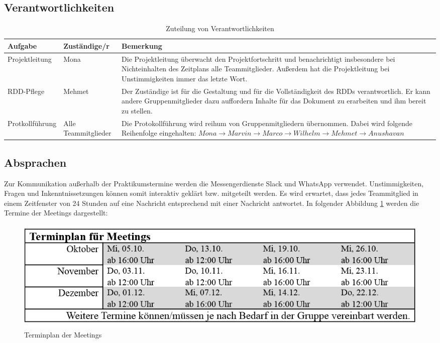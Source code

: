 \documentclass[a4paper, 11pt]{article}
\begin{document}
\subsection{Verantwortlichkeiten}\label{vantw}
\begin{table}[h]
\centering
    \begin{tabularx}{\textwidth}{|l|l|X|}
    \hline
    \textbf{Aufgabe}&\textbf{Zuständige/r}&\textbf{Bemerkung}\\
    \hline
    Projektleitung&Mona&Die Projektleitung überwacht den Projektfortschritt und benachrichtigt insbesondere bei Nichteinhalten des Zeitplans alle Teammitglieder. Außerdem hat die Projektleitung bei Unstimmigkeiten immer das letzte Wort. \\
    \hline
    RDD-Pflege&Mehmet&Der Zuständige ist für die Gestaltung und für die Vollständigkeit des RDDs verantwortlich. Er kann andere Gruppenmitglieder dazu auffordern Inhalte für das Dokument zu erarbeiten und ihm bereit zu stellen. \\
    \hline 
    Protkollführung&Alle Teammitglieder&Die Protokollführung wird reihum von Gruppenmitgliedern übernommen. Dabei wird folgende Reihenfolge eingehalten: $Mona\rightarrow Marvin\rightarrow Marco \rightarrow Wilhelm\rightarrow Mehmet\rightarrow Anushavan$ \\
    \hline
    \end{tabularx}
\caption{Zuteilung von Verantwortlichkeiten}
\label{labelname}
\end{table}

\subsection{Absprachen}
Zur Kommunikation außerhalb der Praktikumstermine werden die Messengerdienste Slack und WhatsApp verwendet. Unstimmigkeiten, Fragen und Inkenntnissetzungen können somit interaktiv geklärt bzw. mitgeteilt werden. Es wird erwartet, dass jedes Teammitglied in einem Zeitfenster von 24 Stunden auf eine Nachricht entsprechend mit einer Nachricht antwortet. In folgender Abbildung \ref{meets} werden die Termine der Meetings dargestellt:
\begin{figure}[h]
\centering 
    \includegraphics[scale=0.85]{images/Terminplan_Meetings.png}
    \caption{Terminplan der Meetings}
    \label{meets}
\end{figure}
\end{document}
